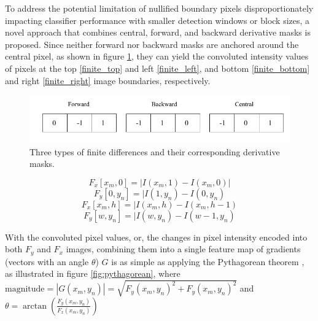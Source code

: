 To address the potential limitation of nullified boundary pixels disproportionately impacting classifier performance with smaller detection windows or block sizes, a novel approach that combines central, forward, and backward derivative masks \cite{niebles2012edge} is proposed. Since neither forward nor backward masks are anchored around the central pixel, as shown in figure \ref{fig:finite_differences}, they can yield the convoluted intensity values of pixels at the top \ref{finite_top} and left \ref{finite_left}, and bottom \ref{finite_bottom} and right \ref{finite_right} image boundaries, respectively.

\begin{figure}
    \centering
    \includegraphics[width=0.75\linewidth]{images/finite_differences.png}
    \caption{Three types of finite differences and their corresponding derivative masks.}
    \label{fig:finite_differences}
\end{figure}

\begin{equation}
    \label{finite_top}
    F_{x}[x_{m},0] =  | I(x_{m},1)-I(x_{m},0) | 
\end{equation}
\begin{equation}
    \label{finite_left}
    F_{y}[0,y_{n}] =  | I(1,y_{n})-I(0,y_{n}) 
\end{equation}
\begin{equation}
    \label{finite_bottom}
    F_{x}[x_{m},h] =  | I(x_{m},h)-I(x_{m},h-1) 
\end{equation}
\begin{equation}
    \label{finite_right}
    F_{y}[w,y_{n}] =  | I(w,y_{n})-I(w-1,y_{n}) 
\end{equation}

With the convoluted pixel values, or, the changes in pixel intensity encoded into both $F_y$ and $F_x$ images, combining them into a single feature map of gradients (vectors with an angle $\theta$) $G$ is as simple as applying the Pythagorean theorem \cite{shidlovskiy_2020_reducing}, as illustrated in figure \ref{fig:pythagorean}, where $ \text{magnitude} = | G(x_{m},y_{n}) | = \sqrt{ F_{y}(x_{m},y_{n})^2+F_{y}(x_{m},y_{n})^2 }$ and $\theta = \arctan \left( \frac{F_{y}(x_{m},y_{n})}{F_{x}(x_{m},y_{n})} \right) $

